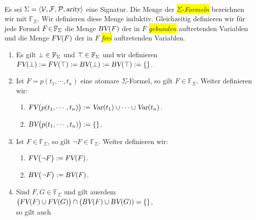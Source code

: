 \begin{Definition} 
\label{praedikaten-formel} \hspace*{\fill} \\
    Es sei $\Sigma = \langle \mathcal{V}, \mathcal{F}, \mathcal{P}, \textsl{arity} \rangle$ eine Signatur.
    Die Menge der \colorbox{yellow}{$\Sigma$-\emph{Formeln}} bezeichnen wir mit $\mathbb{F}_\Sigma$.
    Wir definieren diese Menge induktiv.
    Gleichzeitig definieren wir f\"{u}r jede Formel $F\!\in\! \mathbb{F}_\Sigma$ die Menge $\textsl{BV}(F)$ der in $F$ 
    \colorbox{yellow}{\emph{gebunden}} auftretenden Variablen und die Menge $\textsl{FV}(F)$ der in $F$ \colorbox{yellow}{\emph{frei}} auftretenden Variablen.
    \begin{enumerate}
    \item Es gilt $\bot \in \mathbb{F}_\Sigma$ und $\top \in \mathbb{F}_\Sigma$ und wir definieren \\[0.2cm]
          \hspace*{1.3cm} $\textsl{FV}(\bot) := \textsl{FV}(\top) := \textsl{BV}(\bot) := \textsl{BV}(\top) := \{\}$.
    \item Ist $F = p(t_1,\cdots,t_n)$ eine atomare $\Sigma$-Formel, so gilt $F \in \mathbb{F}_\Sigma$.  Weiter definieren wir:
          \begin{enumerate}
          \item $\textsl{FV}\bigl(p(t_1,\cdots,t_n) \bigr) := \textsl{Var}(t_1) \cup \cdots \cup \textsl{Var}(t_n)$.
          \item $\textsl{BV}\bigl(p(t_1,\cdots,t_n) \bigr) := \{\}$.
          \end{enumerate}
    \item Ist $F \in \mathbb{F}_\Sigma$, so gilt $\neg F \in \mathbb{F}_\Sigma$. Weiter definieren wir:
          \begin{enumerate}
          \item $\textsl{FV}\bigl( \neg F \bigr) := \textsl{FV}(F)$.
          \item $\textsl{BV}\bigl( \neg F \bigr) := \textsl{BV}(F)$.
          \end{enumerate}
    \item Sind $F, G \in \mathbb{F}_\Sigma$ und gilt au\3erdem \\[0.2cm]
          \hspace*{1.3cm}
          $\bigl(\textsl{FV}(F) \cup \textsl{FV}(G)\bigr) \cap \bigl(\textsl{BV}(F) \cup \textsl{BV}(G)) = \{\}$,
          \\[0.2cm]
          so gilt auch
          \begin{enumerate}

\end{enumerate}
\end{enumerate}
\end{Definition}
